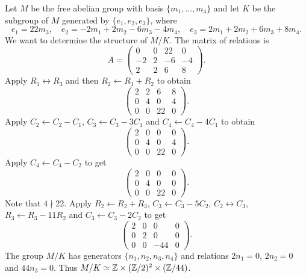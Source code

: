 \begin{example}
Let $M$ be the free abelian group with basis $\{m_1,\dots,m_4\}$ and let $K$
be the subgroup of $M$ generated by 
$\{e_1,e_2,e_3\}$, where 
\[
e_1=22m_3,\quad
e_2=-2m_1+2m_2-6m_3-4m_4,\quad
e_3=2m_1+2m_2+6m_3+8m_4.
\]
We want to determine the structure of $M/K$. 
The matrix of relations is  
\[
A=\begin{pmatrix}
	0 & 0 & 22 & 0\\
	-2 & 2 & -6 & -4\\
	2 & 2 & 6 & 8
\end{pmatrix}.
\]
Apply $R_1\leftrightarrow R_3$ and then $R_2\leftarrow R_1+R_2$ to obtain 
\[
\begin{pmatrix}
	2 & 2 & 6 & 8\\
	0 & 4 & 0 & 4\\
	0 & 0 & 22 & 0
\end{pmatrix}.
\]
Apply $C_2\leftarrow C_2-C_1$, $C_3\leftarrow C_3-3C_1$ and
$C_4\leftarrow C_4-4C_1$ to obtain 
\[
\begin{pmatrix}
	2 & 0 & 0 & 0\\
	0 & 4 & 0 & 4\\
	0 & 0 & 22 & 0
\end{pmatrix}.
\]
Apply $C_4\leftarrow C_4-C_2$ to get 
\[
\begin{pmatrix}
	2 & 0 & 0 & 0\\
	0 & 4 & 0 & 0\\
	0 & 0 & 22 & 0
\end{pmatrix}. 
\]
Note that $4\nmid 22$. Apply $R_2\leftarrow R_2+R_3$, $C_3\leftarrow C_3-5C_2$,
$C_2\leftrightarrow C_3$, $R_3\leftarrow R_3-11R_2$ and $C_3\leftarrow C_3-2C_2$ to
get 
\[
\begin{pmatrix}
	2 & 0 & 0 & 0\\
	0 & 2 & 0 & 0\\
	0 & 0 & -44 & 0
\end{pmatrix}.
\]
The group $M/K$ has generators $\{n_1,n_2,n_3,n_4\}$ and relations 
$2n_1=0$, $2n_2=0$ and $44n_3=0$. Thus $M/K\simeq\mathbb{Z}\times (\mathbb{Z}/2)^2\times (\mathbb{Z}/44)$. 
\end{example}


